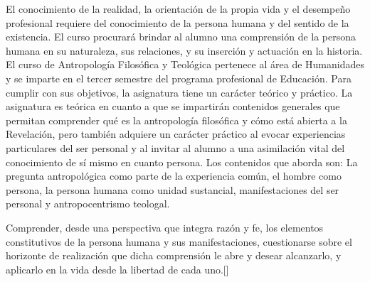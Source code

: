 \begin{syllabus}


\begin{justification}
El conocimiento de la realidad, la orientación de la propia vida y el desempeño profesional requiere del conocimiento de la persona humana y del sentido de la existencia. El curso procurará brindar al alumno una comprensión de la persona humana en su naturaleza, sus relaciones, y su inserción y actuación en la historia.
El curso de Antropología Filosófica y Teológica pertenece al área de Humanidades y se imparte en el tercer semestre del programa profesional de Educación. Para cumplir con sus objetivos, la asignatura tiene un carácter teórico y práctico. La asignatura es teórica en cuanto a que se impartirán contenidos generales que permitan comprender qué es la antropología filosófica y cómo está abierta a la Revelación, pero también adquiere un carácter práctico al evocar experiencias particulares del ser personal y al invitar al alumno a una asimilación vital del conocimiento de sí mismo en cuanto persona. Los contenidos que aborda son: La pregunta antropológica como parte de la experiencia común, el hombre como persona, la persona humana como unidad sustancial, manifestaciones del ser personal y antropocentrismo teologal.
\end{justification}

\begin{goals}
\item Comprender, desde una perspectiva que integra razón y fe, los elementos constitutivos de la persona humana y sus manifestaciones, cuestionarse sobre el horizonte de realización que dicha comprensión le abre y desear alcanzarlo, y aplicarlo en la vida desde la libertad de cada uno.[\Usage]
\end{goals}

\begin{outcomes}
    \item {}
    \item {}
    \item {}
\end{outcomes}
\begin{competences}
    \item {}
    \item {}
	\item {}
\end{competences}


\end{syllabus}
